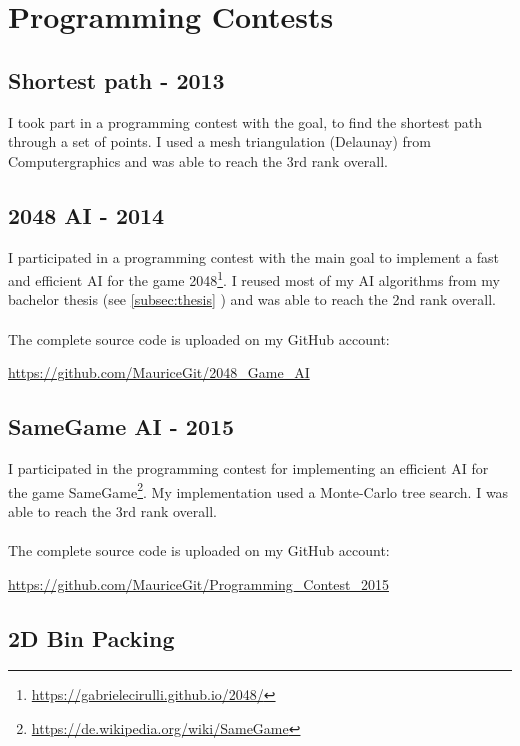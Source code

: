 \documentclass[a4paper, 12pt]{article}
\begin{document}
\section{Programming Contests}

\subsection{Shortest path - 2013}

I took part in a programming contest with the goal, to find the shortest path through a set of points.
I used a mesh triangulation (Delaunay) from Computergraphics and was able to reach the 3rd rank
overall.

\subsection{2048 AI - 2014}

I participated in a programming contest with the main goal to implement a fast and efficient AI for the game
2048\footnote{\url{https://gabrielecirulli.github.io/2048/}}. I reused most of my AI algorithms from my bachelor 
thesis (see \ref{subsec:thesis} \glqq{}\grqq) and was able to reach the 2nd rank overall.
\\
\\
The complete source code is uploaded on my GitHub account:

\begin{center}
	\url{https://github.com/MauriceGit/2048_Game_AI}
\end{center}

\newpage

\subsection{SameGame AI - 2015}

I participated in the programming contest for implementing an efficient AI for the game
SameGame\footnote{\url{https://de.wikipedia.org/wiki/SameGame}}. My implementation used a Monte-Carlo tree 
search. I was able to reach the 3rd rank overall.
\\
\\
The complete source code is uploaded on my GitHub account:

\begin{center}
	\url{https://github.com/MauriceGit/Programming_Contest_2015}
\end{center}


\subsection{2D Bin Packing}
\end{document}
